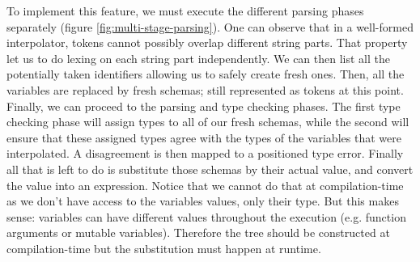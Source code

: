 To implement this feature, we must execute the different parsing phases separately (figure \ref{fig:multi-stage-parsing}). One can observe that in a well-formed interpolator, tokens cannot possibly overlap different string parts. That property let us to do lexing on each string part independently. We can then list all the potentially taken identifiers allowing us to safely create fresh ones. Then, all the variables are replaced by fresh schemas; still represented as tokens at this point. Finally, we can proceed to the parsing and type checking phases. The first type checking phase will assign types to all of our fresh schemas, while the second will ensure that these assigned types agree with the types of the variables that were interpolated. A disagreement is then mapped to a positioned type error. Finally all that is left to do is substitute those schemas by their actual value, and convert the value into an expression. Notice that we cannot do that at compilation-time as we don't have access to the variables values, only their type. But this makes sense: variables can have different values throughout the execution (e.g. function arguments or mutable variables). Therefore the tree should be constructed at compilation-time but the substitution must happen at runtime.
